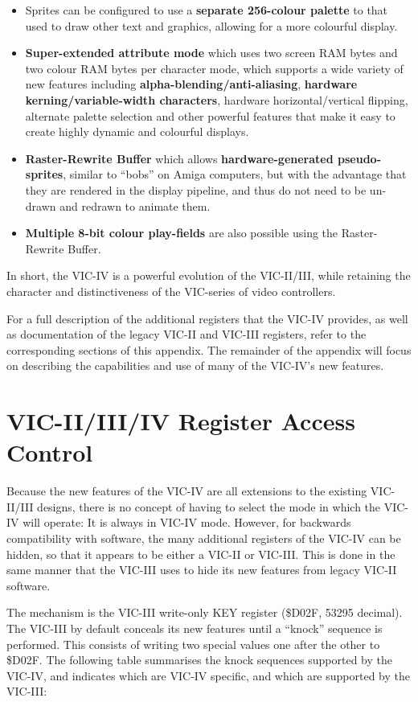 \begin{itemize}
\item Sprites can be configured to use a {\bf separate 256-colour palette} to that used to draw other text and graphics, allowing for a more colourful display.
\item {\bf Super-extended attribute mode} which uses two screen RAM bytes and two colour RAM bytes per character mode, which supports a wide variety of new features including {\bf alpha-blending/anti-aliasing}, {\bf hardware kerning/variable-width characters}, hardware horizontal/vertical flipping, alternate palette selection and other powerful features that make it easy to create highly dynamic and colourful displays.
\item {\bf Raster-Rewrite Buffer} which allows {\bf hardware-generated pseudo-sprites}, similar to ``bobs'' on Amiga\texttrademark{} computers, but with the advantage that they are rendered in the display pipeline, and thus do not need to be un-drawn and redrawn to animate them.
\item {\bf Multiple 8-bit colour play-fields} are also possible using the Raster-Rewrite Buffer.
\end{itemize}

In short, the VIC-IV is a powerful evolution of the VIC-II/III, while retaining the character and distinctiveness of the VIC-series of
video controllers.

For a full description of the additional registers that the VIC-IV provides, as well as documentation of the legacy VIC-II and VIC-III registers, refer to the corresponding sections of this appendix. The remainder of the appendix will focus on describing the capabilities and use of many of the VIC-IV's new features.


\section{VIC-II/III/IV Register Access Control}
Because the new features of the VIC-IV are all extensions to the existing VIC-II/III designs, there is no concept of having to select the mode in which the VIC-IV will operate: It is always in VIC-IV mode. However, for backwards compatibility with software, the many additional registers of the VIC-IV can be hidden, so that it appears to be either a VIC-II or VIC-III. This is done in the same manner that the VIC-III uses to hide its new features from legacy VIC-II software.

 The mechanism is the VIC-III write-only KEY register (\$D02F, 53295 decimal).  The VIC-III by default conceals its new features until a ``knock'' sequence is performed.  This consists of writing two special values one after the other to \$D02F.  The following table summarises the knock sequences supported by the VIC-IV, and indicates which are VIC-IV specific, and which are supported by the VIC-III:

